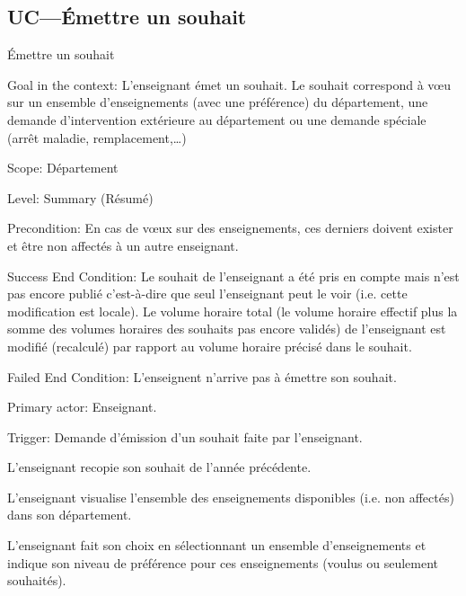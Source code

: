 \subsection{UC---Émettre un souhait}

\begin{usecase}{\'Emettre un souhait}\label{usecase:souhait}
\begin{information}

\item [{Goal in the context:}]
 L'enseignant émet un souhait. Le souhait correspond à vœu sur un ensemble d'enseignements (avec une préférence) du département, une demande d'intervention extérieure au département ou une demande spéciale (arrêt maladie, remplacement,\dots)

\item[Scope:] Département

\item [{Level:}] Summary (Résumé)

\item[{Precondition:}]
 En cas de vœux sur des enseignements, ces derniers doivent exister et être non affectés à un autre enseignant.

\item[{Success End Condition:}]
 Le souhait de l'enseignant a été pris en compte mais n'est pas encore publié c'est-à-dire que seul l'enseignant peut le voir (i.e. cette modification est locale). 
Le volume horaire total (le volume horaire effectif plus la somme des volumes horaires des souhaits pas encore validés) de l'enseignant est modifié (recalculé) par rapport au volume horaire précisé dans le souhait.

\item[{Failed End Condition:}] L'enseignent n'arrive pas à émettre son souhait.
\item[{Primary actor:}] Enseignant.
\item[{Trigger:}] Demande d'émission d'un souhait faite par l'enseignant.
\end{information}

 \begin{scenario}
	 \item L'enseignant recopie son souhait de l'année précédente.
	 \item L'enseignant visualise l'ensemble des enseignements disponibles (i.e. non affectés) dans son département.
	 \item L'enseignant fait son choix en sélectionnant un ensemble d'enseignements et indique son niveau de préférence pour ces enseignements (voulus ou seulement souhaités).
 \end{scenario}



\end{usecase}
